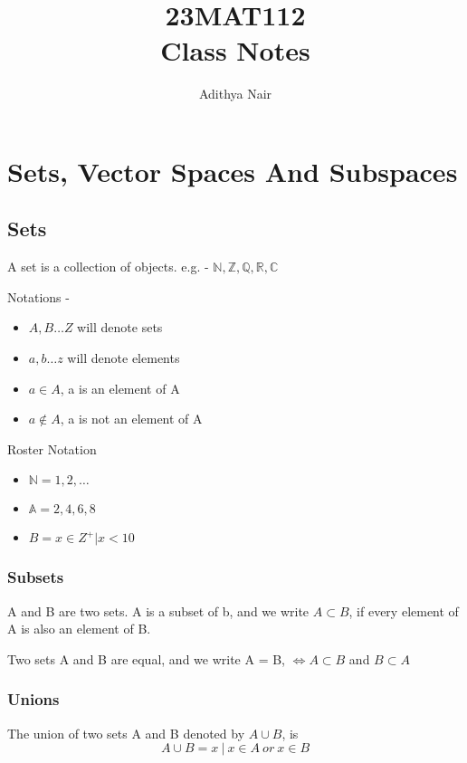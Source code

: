 \documentclass{report}
\title{\Huge{23MAT112}\\ Class Notes}
\author{\huge{Adithya Nair}}
\date{}
\begin{document}
\maketitle
\newpage%
\tableofcontents

\pagebreak
\chapter{Sets, Vector Spaces And Subspaces}
\section{Sets}
\begin{definition}[Sets]
   A set is a collection of objects. e.g. - $\mathbb{N}, \mathbb{Z}, \mathbb{Q}, \mathbb{R}, \mathbb{C}$
\end{definition}

Notations - 
\begin{itemize}
	 \item $A,B \dots Z$ will denote sets
	 \item $a,b \dots z$ will denote elements 
	 \item $a \in A$, a is an element of A
	 \item $a \notin A$, a is not an element of A
\end{itemize}

Roster Notation
\begin{itemize}
      \item $\mathbb{N} = {1,2,\dots}$
      \item $\mathbb{A} = {2,4,6,8}$ 
      \item $B = {x \in Z^+ | x < 10}$
\end{itemize}
\subsection{Subsets}
\begin{definition}[Subsets]
A and B are two sets. A is a subset of b, and we write $A \subset B$, if every element of A is also an element of B.	
\end{definition}
\begin{theorem}
   Two sets A and B are equal, and we write A = B, $\iff A \subset B$ and $B \subset A$
\end{theorem}
\subsection{Unions}
\begin{definition}[Unions]
The union of two sets A and B denoted by $A \cup B$, is 
\[
   A \cup B = {x \ | \ x \in A \ or \ x \in B}
\]
\end{definition}
\end{document}
